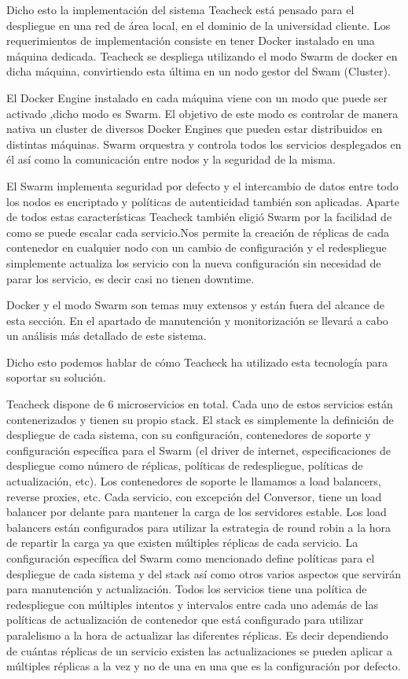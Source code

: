 Dicho esto la implementación del sistema Teacheck está pensado para el despliegue en una red de área local, en el dominio de la universidad cliente. Los requerimientos de implementación consiste en tener Docker instalado en una máquina dedicada. Teacheck se despliega utilizando el modo Swarm de docker en dicha máquina, convirtiendo esta última en un nodo gestor del Swam (Cluster).

El Docker Engine instalado en cada máquina viene con un modo que puede ser activado ,dicho modo es Swarm. El objetivo de este modo es controlar de manera nativa un cluster de diversos Docker Engines que pueden estar distribuidos en distintas máquinas. Swarm orquestra y controla todos los servicios desplegados en él así como la comunicación entre nodos y la seguridad de la misma.

El Swarm implementa seguridad por defecto y el intercambio de datos entre todo los nodos es encriptado y políticas de autenticidad también son aplicadas. Aparte de todos estas características Teacheck también eligió Swarm por la facilidad de como se puede escalar cada servicio.Nos permite la creación de réplicas de cada contenedor en cualquier nodo con un cambio de configuración y el redespliegue simplemente actualiza los servicio con la nueva configuración sin necesidad de parar los servicio, es decir casi no tienen downtime.

Docker y el modo Swarm son temas muy extensos y están fuera del alcance de esta sección. En el apartado de manutención y monitorización se llevará a cabo un análisis más detallado de este sistema. 

Dicho esto podemos hablar de cómo Teacheck ha utilizado esta tecnología para soportar su solución.

Teacheck dispone de 6 microservicios en total. Cada uno de estos servicios están contenerizados y tienen su propio stack. El stack es simplemente la definición de despliegue de cada sistema, con su configuración, contenedores de soporte y configuración específica para el Swarm (el driver de internet, especificaciones de despliegue como número de réplicas, políticas de redespliegue, políticas de actualización, etc). Los contenedores de soporte le llamamos a load balancers, reverse proxies, etc. Cada servicio, con excepción del Conversor, tiene un load balancer por delante para mantener la carga de los servidores estable. Los load balancers están configurados para utilizar la estrategia de round robin a la hora de repartir la carga ya que existen múltiples réplicas de cada servicio. La configuración específica del Swarm como mencionado define políticas para el despliegue de cada sistema y del stack así como otros varios aspectos que servirán para manutención y actualización.
Todos los servicios tiene una política de redespliegue con múltiples intentos y intervalos entre cada uno además de las políticas de actualización de contenedor que está configurado para utilizar paralelismo a la hora de actualizar las diferentes réplicas. Es decir dependiendo de cuántas réplicas de un servicio existen las actualizaciones se pueden aplicar a múltiples réplicas a la vez y no de una en una que es la configuración por defecto.

